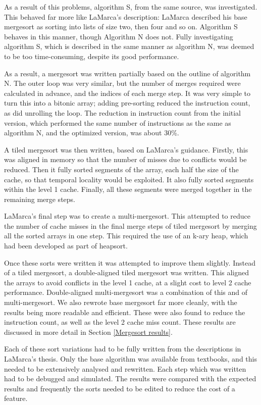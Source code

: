As a result of this problems, algorithm S, from the same source, was
investigated. This behaved far more like LaMarca's description: LaMarca
described his base mergesort as sorting into lists of size two, then four and
so on. Algorithm S behaves in this manner, though Algorithm N does not. Fully
investigating algorithm S, which is described in the same manner as algorithm N,
was deemed to be too time-consuming, despite its good performance.

As a result, a mergesort was written partially based on the outline of algorithm
N. The outer loop was very similar, but the number of merges required were
calculated in advance, and the indices of each merge step. It was very simple
to turn this into a bitonic array; adding pre-sorting reduced the instruction
count, as did unrolling the loop. The reduction in instruction count from the
initial version, which performed the same number of instructions as the same as
algorithm N, and the optimized version, was about 30\%.

A tiled mergesort was then written, based on LaMarca's guidance. Firstly, this
was aligned in memory so that the number of misses due to conflicts would be
reduced. Then it fully sorted segments of the array, each half the size of the
cache, so that temporal locality would be exploited. It also fully sorted
segments within the level 1 cache. Finally, all these segments were merged
together in the remaining merge steps.

LaMarca's final step was to create a multi-mergesort. This attempted to reduce
the number of cache misses in the final merge steps of tiled mergesort by
merging all the sorted arrays in one step. This required the use of an k-ary
heap, which had been developed as part of heapsort.

Once these sorts were written it was attempted to improve them slightly.
Instead of a tiled mergesort, a double-aligned tiled mergesort was written.
This aligned the arrays to avoid conflicts in the level 1 cache, at a slight
cost to level 2 cache performance. Double-aligned multi-mergesort was a
combination of this and of multi-mergesort. We also rewrote base mergesort far
more cleanly, with the results being more readable and efficient. These were
also found to reduce the instruction count, as well as the level 2 cache miss
count. These results are discussed in more detail in Section \ref{Mergesort
results}.

Each of these sort variations had to be fully written from the descriptions in
LaMarca's thesis. Only the base algorithm was available from textbooks, and this
needed to be extensively analysed and rewritten. Each step which was written had
to be debugged and simulated. The results were compared with the expected
results and frequently the sorts needed to be edited to reduce the cost of a
feature.

